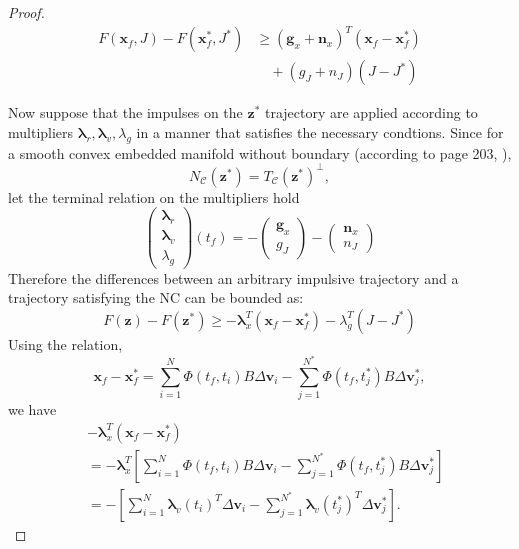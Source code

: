 \documentclass[letterpaper, 10 pt, conference]{ieeeconf}  %
\begin{document}
\begin{proof}
\begin{equation}
\begin{aligned}
F(\mathbf{x}_f,J)-F(\mathbf{x}_f^*,J^*)
&\geq (\boldsymbol{g}_x+\boldsymbol{n}_x)^T(\mathbf{x}_f-\mathbf{x}_f^*)\\
&\quad +(g_J+n_J)(J-J^*)
\end{aligned}
\end{equation}

Now suppose that the impulses on the $\boldsymbol{z}^*$ trajectory are applied according to multipliers $\boldsymbol{\lambda}_r,\boldsymbol{\lambda}_v,\lambda_g $ in a manner that satisfies the necessary condtions. 
Since for a smooth convex embedded manifold without boundary (according to page 203, \cite{Rockafellar2004}),
\[
N_{\mathcal C}(\boldsymbol{z}^*)
=
T_{\mathcal C}(\boldsymbol{z}^*)^\perp,
\]
let the terminal relation on the multipliers hold
\[
\begin{pmatrix}
\boldsymbol{\lambda}_r\\
\boldsymbol{\lambda}_v\\
\lambda_g
\end{pmatrix}(t_f)
=
-
\begin{pmatrix}
\boldsymbol{g}_x\\
g_J
\end{pmatrix}
-
\begin{pmatrix}
\boldsymbol{n}_x\\
n_J
\end{pmatrix}
\]
Therefore the differences between an arbitrary impulsive trajectory and a trajectory satisfying the NC can be bounded as:
\begin{equation}
  F(\boldsymbol{z}) - F(\boldsymbol{z}^*) \geq -\boldsymbol{\lambda}_x^T(\mathbf{x}_f-\mathbf{x}_f^*) - \lambda_g^T(J-J^*)
\end{equation}
Using the relation,
\[
\mathbf{x}_f-\mathbf{x}_f^*
=
\sum_{i=1}^{N}
\Phi(t_f,t_i)B\Delta\boldsymbol{v}_i
-
\sum_{j=1}^{N^*}
\Phi(t_f,t_j^*)B\Delta\boldsymbol{v}_j^*,
\]
we have
\[
\begin{aligned}
&-\boldsymbol{\lambda}_x^T(\mathbf{x}_f-\mathbf{x}_f^*)\\
&=
-\boldsymbol{\lambda}_x^T
\left[
\sum_{i=1}^{N}
\Phi(t_f,t_i)B\Delta\boldsymbol{v}_i
-
\sum_{j=1}^{N^*}
\Phi(t_f,t_j^*)B\Delta\boldsymbol{v}_j^*
\right]\\
&=
-\left[
\sum_{i=1}^{N}
\boldsymbol{\lambda}_v(t_i)^T\Delta\boldsymbol{v}_i
-
\sum_{j=1}^{N^*}
\boldsymbol{\lambda}_v(t_j^*)^T\Delta\boldsymbol{v}_j^*
\right].
\end{aligned}
\]
\end{proof}
\end{document}
